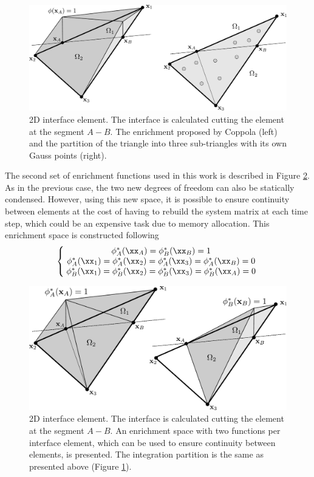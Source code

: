 \begin{figure}[H]
  \centering
  \includegraphics[width=.98\columnwidth]{../images/enrichment1_r1.pdf}
   \caption{2D interface element. The interface is calculated cutting the element at the segment $A-B$. The enrichment proposed by Coppola (left) and the partition of the triangle into three sub-triangles with its own Gauss points (right).}
   \label{fg:enrichment1}                %
\end{figure}

The second set of enrichment functions used in this work is described in Figure \ref{fg:enrichment2}. As in the previous case, the two new degrees of freedom can also be statically condensed. However, using this new space, it is possible to ensure continuity between elements at the cost of having to rebuild the system matrix at each time step, which could be an expensive task due to memory allocation.
This enrichment space is constructed following
\begin{equation}
   \left\{\;
   \begin{matrix}
     \phi_A^*(\xx_A)=\phi_B^*(\xx_B)=1 \\
     \phi_A^*(\xx_1)=\phi_A^*(\xx_2)=\phi_A^*(\xx_3)=\phi_A^*(\xx_B)=0 \\
     \phi_B^*(\xx_1)=\phi_B^*(\xx_2)=\phi_B^*(\xx_3)=\phi_B^*(\xx_A)=0
   \end{matrix}\;
   \right.
   \label{eq:enrich-2a}
\end{equation}

\begin{figure}[H]
  \centering
   \includegraphics[width=.9\columnwidth]{../images/enrichment2_r1.pdf}
   \caption{2D interface element. The interface is calculated cutting the element at the segment $A-B$. An enrichment space with two functions per interface element, which can be used to ensure continuity between elements, is presented. The integration partition is the same as presented above (Figure \ref{fg:enrichment1}).}
   \label{fg:enrichment2}
\end{figure}

